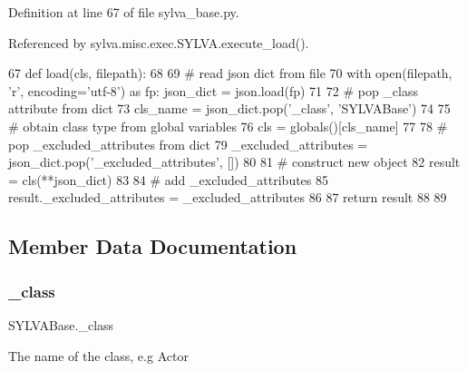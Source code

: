 Definition at line 67 of file sylva\+\_\+base.\+py.



Referenced by sylva.\+misc.\+exec.\+S\+Y\+L\+V\+A.\+execute\+\_\+load().


\begin{DoxyCode}
67     \textcolor{keyword}{def }load(cls, filepath):
68 
69         \textcolor{comment}{# read json dict from file}
70         with open(filepath, \textcolor{stringliteral}{'r', encoding='}utf-8') as fp:            json\_dict = json.load(fp)
71 
72         \textcolor{comment}{# pop \_class attribute from dict}
73         cls\_name = json\_dict.pop(\textcolor{stringliteral}{'\_class'}, \textcolor{stringliteral}{'SYLVABase'})
74 
75         \textcolor{comment}{# obtain class type from global variables}
76         cls = globals()[cls\_name]
77 
78         \textcolor{comment}{# pop \_excluded\_attributes from dict}
79         \_excluded\_attributes = json\_dict.pop(\textcolor{stringliteral}{'\_excluded\_attributes'}, [])
80 
81         \textcolor{comment}{# construct new object}
82         result = cls(**json\_dict)
83 
84         \textcolor{comment}{# add \_excluded\_attributes}
85         result.\_excluded\_attributes = \_excluded\_attributes
86 
87         \textcolor{keywordflow}{return} result
88 
89 \end{DoxyCode}


\subsection{Member Data Documentation}
\mbox{\label{classsylva_1_1base_1_1sylva__base_1_1_s_y_l_v_a_base_a7225be10455bba307832200d18167bd4}} 
\subsubsection{\texorpdfstring{\+\_\+class}{\_class}}
{\footnotesize\ttfamily S\+Y\+L\+V\+A\+Base.\+\_\+class\hspace{0.3cm}{\ttfamily [private]}}



The name of the class, e.\+g {\ttfamily Actor} 



